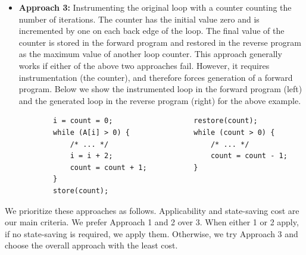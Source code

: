 \begin{itemize}
\item \textbf{Approach 3:} Instrumenting the original loop with a counter counting the number of iterations. The counter has the initial value zero and is incremented by one on each back edge of the loop.
The final value of the counter is stored in the forward program and restored in the reverse program as the maximum value of another loop counter.
This approach generally works if either of the above two approaches fail.
However, it requires instrumentation (the counter), and therefore forces generation of a forward program. Below we show the instrumented loop in the forward program (left) and the generated loop in the reverse program (right) for the above example.


\small
\begin{verbatim}
        i = count = 0;                   restore(count);
        while (A[i] > 0) {               while (count > 0) {
            /* ... */                        /* ... */
            i = i + 2;                       count = count - 1;
            count = count + 1;           }
        }                             
        store(count);
\end{verbatim}
\normalsize



\end{itemize}

We prioritize these approaches as follows.
Applicability and state-saving cost are our main criteria.
We prefer Approach 1 and 2 over 3.
When either 1 or 2 apply, if no state-saving is required, we apply them.
Otherwise, we try Approach 3 and choose the overall approach with the least cost.

\vspace{3mm}

